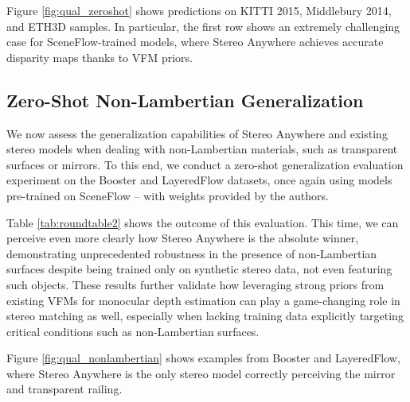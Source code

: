 \documentclass[10pt,twocolumn,letterpaper]{article}
\newcommand{\method}[0]{Stereo Anywhere\xspace}
\begin{document}
Figure \ref{fig:qual_zeroshot} shows predictions on KITTI 2015, Middlebury 2014, and ETH3D samples. In particular, the first row shows an extremely challenging case for SceneFlow-trained models, where \method achieves accurate disparity maps thanks to VFM priors.

\subsection{Zero-Shot Non-Lambertian Generalization}

We now assess the generalization capabilities of \method and existing stereo models when dealing with non-Lambertian materials, such as transparent surfaces or mirrors. To this end, we conduct a zero-shot generalization evaluation experiment on the Booster \cite{Ramirez_2022_CVPR} and LayeredFlow \cite{wen2024layeredflow} datasets, once again using models pre-trained on SceneFlow \cite{mayer2016large} -- with weights provided by the authors.

Table \ref{tab:roundtable2} shows the outcome of this evaluation. This time, we can perceive even more clearly how \method is the absolute winner, demonstrating unprecedented robustness in the presence of non-Lambertian surfaces despite being trained only on synthetic stereo data, not even featuring such objects. These results further validate how leveraging strong priors from existing VFMs for monocular depth estimation can play a game-changing role in stereo matching as well, especially when lacking training data explicitly targeting critical conditions such as non-Lambertian surfaces.

Figure \ref{fig:qual_nonlambertian} shows examples from Booster and LayeredFlow, where \method is the only stereo model correctly perceiving the mirror and transparent railing.
\end{document}

